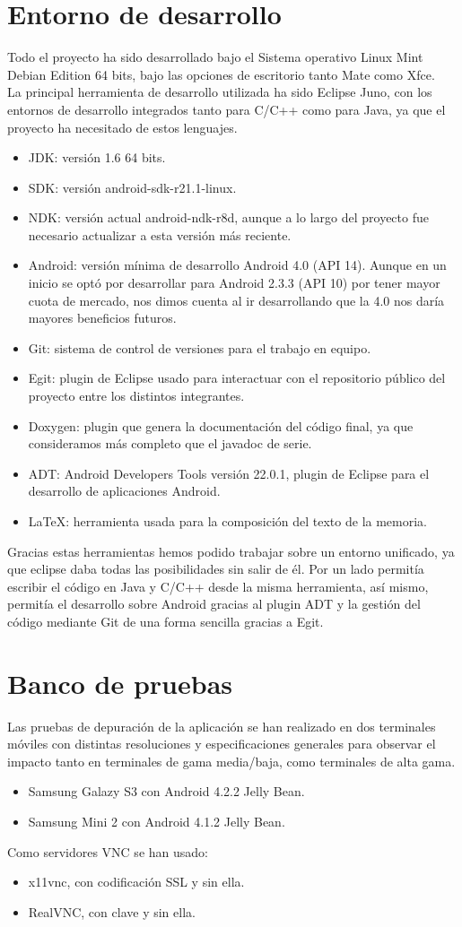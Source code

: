 \section{Entorno de desarrollo}
Todo el proyecto ha sido desarrollado bajo el Sistema operativo Linux Mint Debian Edition 64 bits, bajo las opciones de escritorio tanto Mate como Xfce.\\

La principal herramienta de desarrollo utilizada ha sido Eclipse Juno, con los entornos de desarrollo integrados tanto para C/C++ como para Java, ya que el proyecto ha necesitado de estos lenguajes.
\begin{itemize}
\item JDK: versión 1.6 64 bits.
\item SDK: versión android-sdk-r21.1-linux.
\item NDK: versión actual android-ndk-r8d, aunque a lo largo del proyecto fue necesario actualizar a esta versión más reciente.
\item Android: versión mínima de desarrollo Android 4.0 (API 14). Aunque en un inicio se optó por desarrollar para Android 2.3.3 (API 10) por tener mayor cuota de mercado, nos dimos cuenta al ir desarrollando que la 4.0 nos daría mayores beneficios futuros.
\item Git: sistema de control de versiones para el trabajo en equipo.
\item Egit: plugin de Eclipse usado para interactuar con el repositorio público del proyecto entre los distintos integrantes.
\item Doxygen: plugin que genera la documentación del código final, ya que consideramos más completo que el javadoc de serie.
\item ADT: Android Developers Tools versión 22.0.1, plugin de Eclipse para el desarrollo de aplicaciones Android.
\item LaTeX: herramienta usada para la composición del texto de la memoria.
\end{itemize}

Gracias estas herramientas hemos podido trabajar sobre un entorno unificado, ya que eclipse daba todas las posibilidades sin salir de él. Por un lado permitía escribir el código en Java y C/C++ desde la misma herramienta, así mismo, permitía el desarrollo sobre Android gracias al plugin ADT y la gestión del código mediante Git de una forma sencilla gracias a Egit. 



\newpage
\section{Banco de pruebas}
Las pruebas de depuración de la aplicación se han realizado en dos terminales móviles con distintas resoluciones y especificaciones generales para observar el impacto tanto en terminales de gama media/baja, como terminales de alta gama.
\begin{itemize}
\item Samsung Galazy S3 con Android 4.2.2 Jelly Bean.
\item Samsung Mini 2 con Android 4.1.2 Jelly Bean.
\end{itemize}

Como servidores VNC se han usado:
\begin{itemize}
\item x11vnc, con codificación SSL y sin ella.
\item RealVNC, con clave y sin ella.
\end{itemize}
